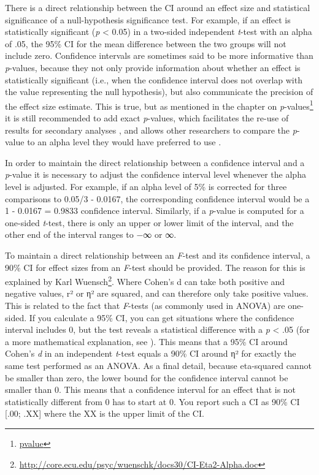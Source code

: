 \documentclass[
  oneside]{krantz}
\renewcommand{\href}[2]{#2\footnote{\url{#1}}}
\begin{document}
There is a direct relationship between the CI around an effect size and statistical significance of a null-hypothesis significance test. For example, if an effect is statistically significant (\emph{p} \textless{} 0.05) in a two-sided independent \emph{t}-test with an alpha of .05, the 95\% CI for the mean difference between the two groups will not include zero. Confidence intervals are sometimes said to be more informative than \emph{p}-values, because they not only provide information about whether an effect is statistically significant (i.e., when the confidence interval does not overlap with the value representing the null hypothesis), but also communicate the precision of the effect size estimate. This is true, but as mentioned in the chapter on \href{pvalue}{\emph{p}-values} it is still recommended to add exact \emph{p}-values, which facilitates the re-use of results for secondary analyses \citep{appelbaum_journal_2018}, and allows other researchers to compare the \emph{p}-value to an alpha level they would have preferred to use \citep{lehmann_testing_2005}.

In order to maintain the direct relationship between a confidence interval and a \emph{p}-value it is necessary to adjust the confidence interval level whenever the alpha level is adjusted. For example, if an alpha level of 5\% is corrected for three comparisons to 0.05/3 - 0.0167, the corresponding confidence interval would be a 1 - 0.0167 = 0.9833 confidence interval. Similarly, if a \emph{p}-value is computed for a one-sided \emph{t}-test, there is only an upper or lower limit of the interval, and the other end of the interval ranges to −∞ or ∞.

To maintain a direct relationship between an \emph{F}-test and its confidence interval, a 90\% CI for effect sizes from an \emph{F}-test should be provided. The reason for this is explained by \href{http://core.ecu.edu/psyc/wuenschk/docs30/CI-Eta2-Alpha.doc}{Karl Wuensch}. Where Cohen's d can take both positive and negative values, r² or η² are squared, and can therefore only take positive values. This is related to the fact that \emph{F}-tests (as commonly used in ANOVA) are one-sided. If you calculate a 95\% CI, you can get situations where the confidence interval includes 0, but the test reveals a statistical difference with a \emph{p} \textless{} .05 (for a more mathematical explanation, see \citet{steiger_beyond_2004}). This means that a 95\% CI around Cohen's \emph{d} in an independent \emph{t}-test equals a 90\% CI around η² for exactly the same test performed as an ANOVA. As a final detail, because eta-squared cannot be smaller than zero, the lower bound for the confidence interval cannot be smaller than 0. This means that a confidence interval for an effect that is not statistically different from 0 has to start at 0. You report such a CI as 90\% CI {[}.00; .XX{]} where the XX is the upper limit of the CI.
\end{document}
